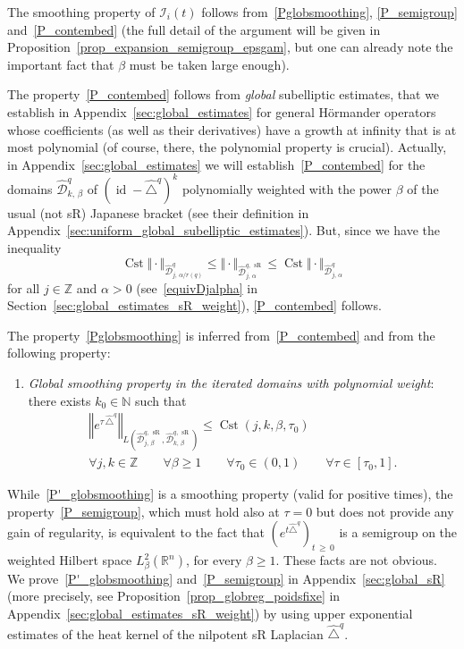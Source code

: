 \documentclass[AHL,Unicode,published]{cedram}
\newcommand*\R{\mathbb{R}}
\newcommand*\N{\mathbb{N}}
\newcommand*\Z{\mathbb{Z}}
\newcommand{\calI}{\mathcal{I}}
\newcommand{\calD}{\mathcal{D}}
\DeclareMathOperator{\Cst}{Cst}
\DeclareMathOperator{\id}{id}
\DeclareMathOperator{\sR}{sR}
\renewcommand{\geq}{\geqslant}
\renewcommand{\leq}{\leqslant}
\newcommand*{\Peenumi}{\renewcommand*{\theenumi}{$\mathbf{P'}_\arabic{enumi}$}}
\let\oldforall\forall
\renewcommand*{\forall}{\mathrel{\oldforall}}
\begin{document}
The smoothing property of $\calI_i(t)$ follows from~\eqref{Pglobsmoothing}, \eqref{P_semigroup} and~\eqref{P_contembed} (the full detail of the argument will be given in Proposition~\eqref{prop_expansion_semigroup_epsgam}, but one can already note the important fact that $\beta$ must be taken large enough).

The property~\eqref{P_contembed} follows from \emph{global} subelliptic estimates, that we establish in Appendix~\ref{sec:global_estimates} for general H\"ormander operators whose coefficients (as well as their derivatives) have a growth at infinity that is at most polynomial (of course, there, the polynomial property is crucial). Actually, in Appendix~\ref{sec:global_estimates} we will establish~\eqref{P_contembed} for the domains $\widehat{\calD}^{q}_{k,\,\beta}$ of $(\id - \widehat{\triangle}^{q})^k$ polynomially weighted with the power $\beta$ of the usual (not sR) Japanese bracket (see their definition in Appendix~\ref{sec:uniform_global_subelliptic_estimates}). But, since we have the inequality
\[
\Cst \Vert \cdot\Vert_{\widehat{\calD}^q_{j,\,\alpha/r(q)}} \leq \Vert \cdot\Vert_{\widehat{\calD}_{j,\,\alpha}^{q,\,\sR}} \leq \Cst \Vert \cdot\Vert_{\widehat{\calD}^q_{j,\,\alpha}}
\]
for all $j\in\Z$ and $\alpha>0$ (see~\eqref{equivDjalpha} in Section~\ref{sec:global_estimates_sR_weight}), \eqref{P_contembed} follows.

The property~\eqref{Pglobsmoothing} is inferred from~\eqref{P_contembed} and from the following property:
\begin{enumerate}\Peenumi
\item\label{P'_globsmoothing}
\emph{Global smoothing property in the iterated domains with polynomial weight}: there exists $k_0\in\N$ such that
\begin{multline*}
\left\Vert e^{\tau\,\widehat{\triangle}^{q}}\right\Vert_{L\left(\widehat{\calD}^{q,\,\sR}_{j,\,\beta}, \widehat{\calD}^{q,\,\sR}_{k,\,\beta}\right)} \leq \Cst(j,k,\beta,\tau_0) \\
\forall j,k\in\Z\qquad \forall\beta\geq 1 \qquad \forall \tau_0\in(0,1) \qquad \forall \tau\in[\tau_0,1].
\end{multline*}
\end{enumerate}
While~\eqref{P'_globsmoothing} is a smoothing property (valid for positive times), the property~\eqref{P_semigroup}, which must hold also at $\tau=0$ but does not provide any gain of regularity, is equivalent to the fact that $(e^{t\widehat{\triangle}^{q}})_{t\,\geq\,0}$ is a semigroup on the weighted Hilbert space $L^2_\beta(\R^n)$, for every $\beta\geq 1$. These facts are not obvious. We prove~\eqref{P'_globsmoothing} and~\eqref{P_semigroup} in Appendix~\ref{sec:global_sR} (more precisely, see Proposition~\ref{prop_globreg_poidsfixe} in Appendix~\ref{sec:global_estimates_sR_weight}) by using upper exponential estimates of the heat kernel of the nilpotent sR Laplacian $\widehat{\triangle}^{q}$.
\end{document}
